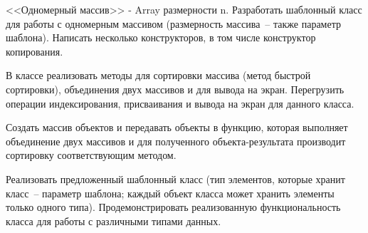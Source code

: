 
<<Одномерный массив>> - Array размерности n. Разработать шаблонный класс для работы
с одномерным массивом (размерность массива~-- также параметр шаблона). Написать
несколько конструкторов, в том числе конструктор копирования.

В классе реализовать
методы для сортировки массива (метод быстрой сортировки), объединения двух массивов
и для вывода на экран. Перегрузить операции индексирования, присваивания и вывода на
экран для данного класса.

Создать массив объектов и передавать объекты в функцию,
которая выполняет объединение двух массивов и для полученного объекта-результата
производит сортировку соответствующим методом.

Реализовать предложенный шаблонный класс (тип элементов, которые
хранит класс~-- параметр шаблона; каждый объект класса может хранить
элементы только одного типа). Продемонстрировать реализованную
функциональность класса для работы с различными типами данных.

